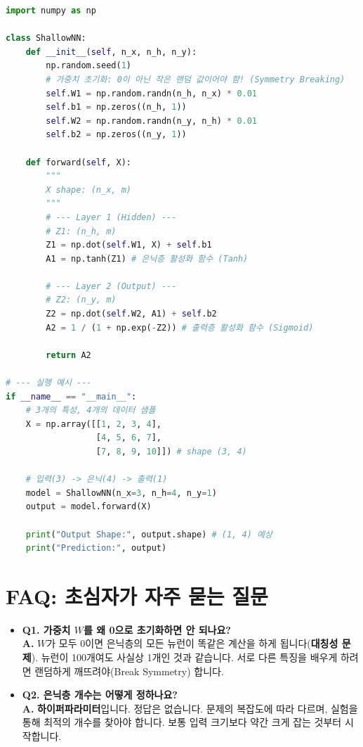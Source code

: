 \documentclass[11pt,a4paper]{book}
\theoremstyle{definition}
\begin{document}
\begin{lstlisting}[language=Python, caption=Shallow Neural Network Forward Propagation, breaklines=true]
import numpy as np

class ShallowNN:
    def __init__(self, n_x, n_h, n_y):
        np.random.seed(1)
        # 가중치 초기화: 0이 아닌 작은 랜덤 값이어야 함! (Symmetry Breaking)
        self.W1 = np.random.randn(n_h, n_x) * 0.01
        self.b1 = np.zeros((n_h, 1))
        self.W2 = np.random.randn(n_y, n_h) * 0.01
        self.b2 = np.zeros((n_y, 1))

    def forward(self, X):
        """
        X shape: (n_x, m)
        """
        # --- Layer 1 (Hidden) ---
        # Z1: (n_h, m)
        Z1 = np.dot(self.W1, X) + self.b1 
        A1 = np.tanh(Z1) # 은닉층 활성화 함수 (Tanh)
        
        # --- Layer 2 (Output) ---
        # Z2: (n_y, m)
        Z2 = np.dot(self.W2, A1) + self.b2
        A2 = 1 / (1 + np.exp(-Z2)) # 출력층 활성화 함수 (Sigmoid)
        
        return A2

# --- 실행 예시 ---
if __name__ == "__main__":
    # 3개의 특성, 4개의 데이터 샘플
    X = np.array([[1, 2, 3, 4], 
                  [4, 5, 6, 7], 
                  [7, 8, 9, 10]]) # shape (3, 4)
                  
    # 입력(3) -> 은닉(4) -> 출력(1)
    model = ShallowNN(n_x=3, n_h=4, n_y=1)
    output = model.forward(X)
    
    print("Output Shape:", output.shape) # (1, 4) 예상
    print("Prediction:", output)
\end{lstlisting}

\section{FAQ: 초심자가 자주 묻는 질문}
\begin{itemize}
    \item \textbf{Q1. 가중치 $W$를 왜 0으로 초기화하면 안 되나요?} \\
    \textbf{A.} $W$가 모두 0이면 은닉층의 모든 뉴런이 똑같은 계산을 하게 됩니다(\textbf{대칭성 문제}). 뉴런이 100개여도 사실상 1개인 것과 같습니다. 서로 다른 특징을 배우게 하려면 랜덤하게 깨뜨려야(Break Symmetry) 합니다.
    
    \item \textbf{Q2. 은닉층 개수는 어떻게 정하나요?} \\
    \textbf{A.} \textbf{하이퍼파라미터}입니다. 정답은 없습니다. 문제의 복잡도에 따라 다르며, 실험을 통해 최적의 개수를 찾아야 합니다. 보통 입력 크기보다 약간 크게 잡는 것부터 시작합니다.
\end{itemize}
\end{document}
